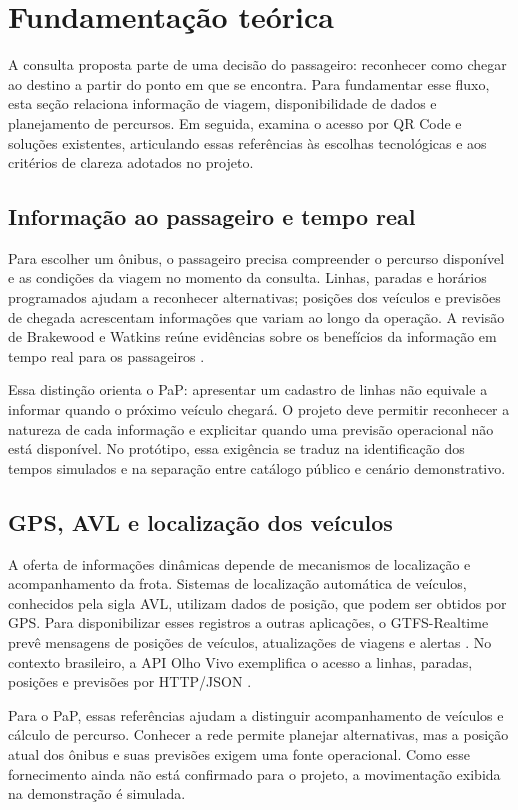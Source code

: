 \documentclass[12pt,oneside,a4paper,brazil]{abntex2}
\begin{document}
\section{Fundamentação teórica}
A consulta proposta parte de uma decisão do passageiro: reconhecer como chegar ao destino a partir do ponto em que se encontra. Para fundamentar esse fluxo, esta seção relaciona informação de viagem, disponibilidade de dados e planejamento de percursos. Em seguida, examina o acesso por QR Code e soluções existentes, articulando essas referências às escolhas tecnológicas e aos critérios de clareza adotados no projeto.

\subsection{Informação ao passageiro e tempo real}
Para escolher um ônibus, o passageiro precisa compreender o percurso disponível e as condições da viagem no momento da consulta. Linhas, paradas e horários programados ajudam a reconhecer alternativas; posições dos veículos e previsões de chegada acrescentam informações que variam ao longo da operação. A revisão de Brakewood e Watkins reúne evidências sobre os benefícios da informação em tempo real para os passageiros \citep{brakewood2019}.

Essa distinção orienta o PaP: apresentar um cadastro de linhas não equivale a informar quando o próximo veículo chegará. O projeto deve permitir reconhecer a natureza de cada informação e explicitar quando uma previsão operacional não está disponível. No protótipo, essa exigência se traduz na identificação dos tempos simulados e na separação entre catálogo público e cenário demonstrativo.

\subsection{GPS, AVL e localização dos veículos}
A oferta de informações dinâmicas depende de mecanismos de localização e acompanhamento da frota. Sistemas de localização automática de veículos, conhecidos pela sigla AVL, utilizam dados de posição, que podem ser obtidos por GPS. Para disponibilizar esses registros a outras aplicações, o GTFS-Realtime prevê mensagens de posições de veículos, atualizações de viagens e alertas \citep{gtfs}. No contexto brasileiro, a API Olho Vivo exemplifica o acesso a linhas, paradas, posições e previsões por HTTP/JSON \citep{sptransapi}.

Para o PaP, essas referências ajudam a distinguir acompanhamento de veículos e cálculo de percurso. Conhecer a rede permite planejar alternativas, mas a posição atual dos ônibus e suas previsões exigem uma fonte operacional. Como esse fornecimento ainda não está confirmado para o projeto, a movimentação exibida na demonstração é simulada.
\end{document}
